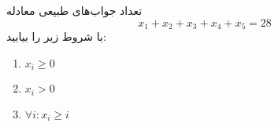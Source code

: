     \p 
تعداد جواب‌های طبیعی معادله
$$x_1 + x_2 + x_3 + x_4 + x_5 = 28$$
با شروط زیر را بیابید:
\begin{enumerate}
\item
$x_i \geq 0$
\item
$x_i > 0$
\item
$\forall i: x_i \geq i$
\end{enumerate}